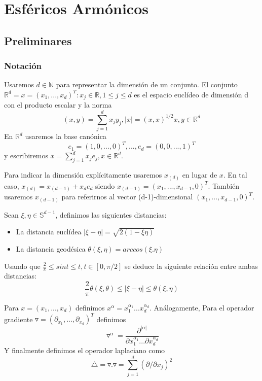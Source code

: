 
\chapter[Esféricos Armónicos]
        {Esféricos Armónicos}
\section{Preliminares}
\subsection{Notación}
Usaremos $d\in\mathds{N}$ para representar la dimensión de un conjunto. El conjunto $\mathds{R}^d = {x=(x_1,...,x_d)^T : x_j\in\mathds{R},1 \le j \le d}$ es el espacio euclídeo de dimensión d con el producto escalar y la norma
$$
(x,y) = \sum_{j=1}^{d} x_jy_j  , |x|=(x,x)^{1/2} x,y\in\mathds{R}^d
$$
En $\mathds{R}^d$ usaremos la base canónica
$$
e_1=(1,0,...,0)^T, ..., e_d=(0,0,...,1)^T
$$
y escribiremos $x = \sum_{j=1}^{d} x_je_j, x\in\mathds{R}^d$.
\medskip

Para indicar la dimensión explícitamente usaremos $x_{(d)}$ en lugar de $x$. En tal caso, $x_{(d)} = x_{(d-1)}+x_de_d$ siendo $x_{(d-1)}=(x_1,...,x_{d-1},0)^T$. También usaremos $x_{(d-1)}$ para referirnos al vector (d-1)-dimensional $(x_1,...,x_{d-1},0)^T$.

\begin{defn} Sean $\xi,\eta\in\mathds{S}^{d-1}$, definimos las siguientes distancias:
	\begin{itemize}
		\item La distancia euclídea $|\xi-\eta| = \sqrt{2(1-\xi\eta)}$
		\item La distancia geodésica $\theta(\xi,\eta)=arccos(\xi.\eta)$
	\end{itemize}	
\end{defn}

\begin{rem}Usando que $\frac{2}{\pi} \le sin t \le t,       t\in[0,\pi/2]$ se deduce la siguiente relación entre ambas distancias:
	$$
	\frac{2}{\pi}\theta(\xi,\theta) \le |\xi - \eta| \le \theta(\xi,\eta)
	$$ 
\end{rem}

Para $x =(x_1,...,x_d)$ definimos $x^\alpha = x_1^{\alpha_1}...x_d^{\alpha_d}$. Análogamente,
Para el operador gradiente $\triangledown = (\partial_{x_1},...,\partial_{x_d})^T$ definimos
$$
	\triangledown^\alpha = \frac{\partial^{|\alpha|}}{\partial x_1^{\alpha_1}...\partial x_d^{\alpha_d}}
$$
Y finalmente definimos el operador laplaciano como
$$
	\triangle = \triangledown.\triangledown = \sum_{j=1}^{d}(\partial/\partial x_j)^2
$$

